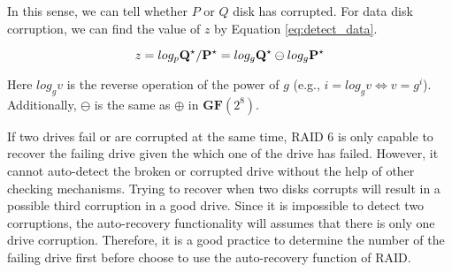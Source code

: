 In this sense, we can tell whether $P$ or $Q$ disk has corrupted. For data disk corruption, we can find the value of $z$ by Equation \ref{eq:detect_data}.

\begin{equation}\label{eq:detect_data}
	z = log_p{{\bf Q}^\star/{\bf P}^\star} = log_{g}{\bf Q}^\star\ominus log_{g}{\bf P}^\star
\end{equation}

Here $log_{g}v$ is the reverse operation of the power of $g$ (e.g., $i=log_{g}v\!\iff\!v=g^i$). Additionally, $\ominus$ is the same as $\oplus$ in $\mathbf{GF}(2^8)$.

If two drives fail or are corrupted at the same time, RAID 6 is only capable to recover the failing drive given the which one of the drive has failed. However, it cannot auto-detect the broken or corrupted drive without the help of other checking mechanisms. Trying to recover when two disks corrupts will result in a possible third corruption in a good drive. Since it is impossible to detect two corruptions, the auto-recovery functionality will assumes that there is only one drive corruption. Therefore, it is a good practice to determine the number of the failing drive first before choose to use the auto-recovery function of RAID.

